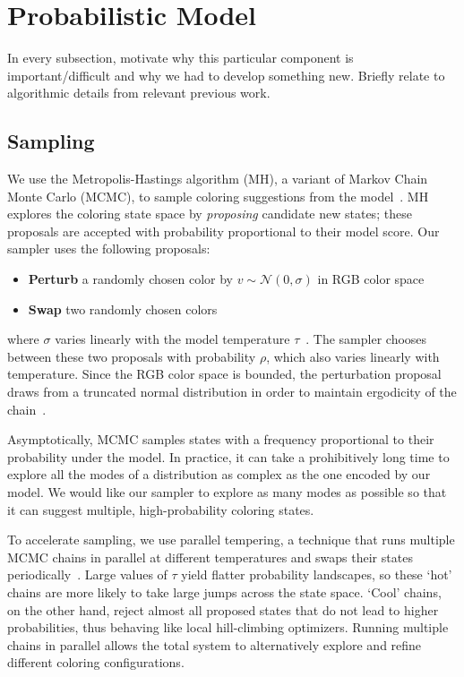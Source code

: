 \section{Probabilistic Model}
\label{sec:model}



In every subsection, motivate why this particular component is important/difficult and why we had to develop something new. Briefly relate to algorithmic details from relevant previous work.



\subsection{Sampling}
\label{sec:sampling}

We use the Metropolis-Hastings algorithm (MH), a variant of Markov Chain Monte Carlo (MCMC), to sample coloring suggestions from the model~\cite{Metropolis,Hastings}. MH explores the coloring state space by \emph{proposing} candidate new states; these proposals are accepted with probability proportional to their model score. Our sampler uses the following proposals:
\begin{itemize}
	\item{\textbf{Perturb} a randomly chosen color by $v \sim \mathcal{N}(0, \sigma)$ in RGB color space}
	\item{\textbf{Swap} two randomly chosen colors}
\end{itemize}
where $\sigma$ varies linearly with the model temperature $\tau$~. The sampler chooses between these two proposals with probability $\rho$, which also varies linearly with temperature. Since the RGB color space is bounded, the perturbation proposal draws from a truncated normal distribution in order to maintain ergodicity of the chain~\cite{TruncatedGaussians}.

Asymptotically, MCMC samples states with a frequency proportional to their probability under the model. In practice, it can take a prohibitively long time to explore all the modes of a distribution as complex as the one encoded by our model. We would like our sampler to explore as many modes as possible so that it can suggest multiple, high-probability coloring states.

To accelerate sampling, we use parallel tempering, a technique that runs multiple MCMC chains in parallel at different temperatures and swaps their states periodically~\cite{ParallelTempering}. Large values of $\tau$ yield flatter probability landscapes, so these `hot' chains are more likely to take large jumps across the state space. `Cool' chains, on the other hand, reject almost all proposed states that do not lead to higher probabilities, thus behaving like local hill-climbing optimizers. Running multiple chains in parallel allows the total system to alternatively explore and refine different coloring configurations.

